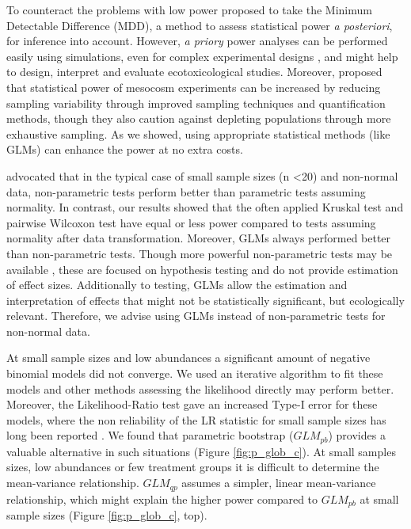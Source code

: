 \documentclass{scrartcl}
\begin{document}
To counteract the problems with low power \citet{brock_minimum_2015} proposed to take the Minimum Detectable Difference (MDD), a method to assess statistical power \emph{a posteriori}, for inference into account.
However, \emph{a priory} power analyses can be performed easily using simulations, even for complex experimental designs \citep{johnson_power_2014}, and might help to design, interpret and evaluate ecotoxicological studies.
Moreover, \citet{brock_minimum_2015} proposed that statistical power of mesocosm experiments can be increased by reducing sampling variability through improved sampling techniques and quantification methods, though they also caution against depleting populations through more exhaustive sampling.
As we showed, using appropriate statistical methods (like GLMs) can enhance the power at no extra costs.

\citet{wang_making_2011} advocated that in the typical case of small sample sizes (n \textless 20) and non-normal data, non-parametric tests perform better than parametric tests assuming normality.
In contrast, our results showed that the often applied Kruskal test and pairwise Wilcoxon test have equal or less power compared to tests assuming normality after data transformation.
Moreover, GLMs always performed better than non-parametric tests. 
Though more powerful non-parametric tests may be available \citep{konietschke_rank-based_2012}, these are focused on hypothesis testing and do not provide estimation of effect sizes.
Additionally to testing, GLMs allow the estimation and interpretation of effects that might not be statistically significant, but ecologically relevant.
Therefore, we advise using GLMs instead of non-parametric tests for non-normal data.

At small sample sizes and low abundances a significant amount of negative binomial models did not converge.
We used an iterative algorithm to fit these models \citep{venables_modern_2002} and other methods assessing the likelihood directly may perform better.
Moreover, the Likelihood-Ratio test gave an increased Type-I error for these models, where the non reliability of the LR statistic for small sample sizes has long been reported \citep{bolker_generalized_2009,wilks_large-sample_1938}. 
We found that parametric bootstrap ($GLM_{pb}$) provides a valuable alternative in such situations (Figure \ref{fig:p_glob_c}).
At small samples sizes, low abundances or few treatment groups it is difficult to determine the mean-variance relationship.
$GLM_{qp}$ assumes a simpler, linear mean-variance relationship, which might explain the higher power compared to $GLM_{pb}$ at small sample sizes (Figure \ref{fig:p_glob_c}, top).
\end{document}
